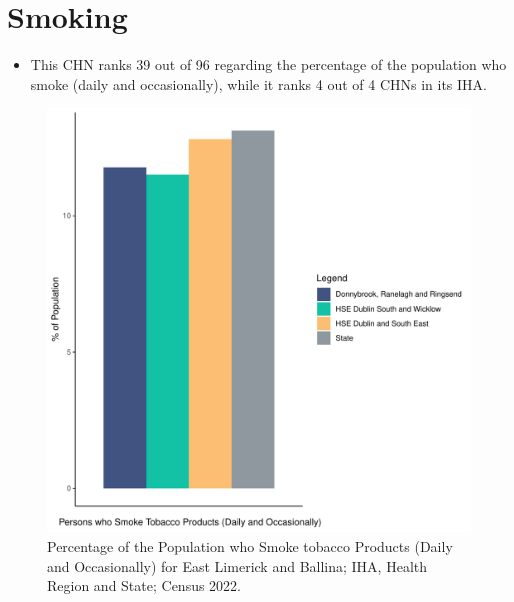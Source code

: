 \documentclass{article}
\begin{document}
\pagebreak

\section{Smoking}\label{sect:Smoking}
\begin{itemize}
\item This CHN ranks  39 out of 96 regarding the percentage of the population who smoke (daily and occasionally), while it ranks   4 out of 4 CHNs in its IHA.
\end{itemize}
\begin{figure}[H]
	\centering
	\includegraphics[width = 120mm]{../figures/SmokingED.pdf}
	\caption{Percentage of the Population who Smoke tobacco Products (Daily and Occasionally) for East Limerick and Ballina; IHA, Health Region and State; Census 2022.}
	\label{fig:2ae19629-1a6a-13a3-e055-000000000001}
	\end{figure}
	
\end{document}
